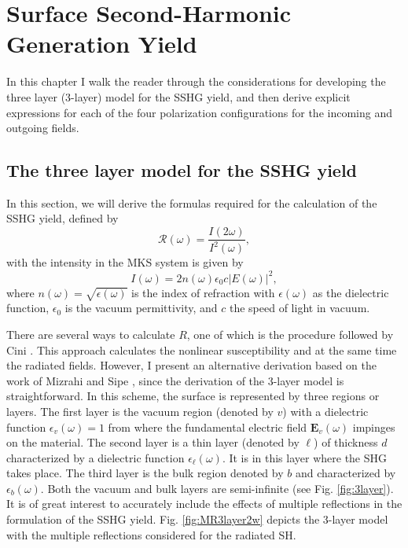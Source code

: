 \chapter{Surface Second-Harmonic Generation Yield}
\minitoc

In this chapter I walk the reader through the considerations for developing the
three layer (3-layer) model for the SSHG yield, and then derive explicit
expressions for each of the four polarization configurations for the incoming
and outgoing fields.



\section{The three layer model for the SSHG yield}

In this section, we will derive the formulas required for the calculation of the
SSHG yield, defined by
\begin{equation}\label{uno}
\mathcal{R}(\omega)=\frac{I(2\omega)}{I^2(\omega)},
\end{equation}
with the intensity in the MKS system is given by \cite{boyd, sutherland}
\begin{equation}\label{dos}
I(\omega)=2n(\omega)\epsilon_{0}c|E(\omega)|^2,
\end{equation}
where $n(\omega)=\sqrt{\epsilon(\omega)}$ is the index of refraction with
$\epsilon(\omega)$ as the dielectric function, $\epsilon_{0}$ is the vacuum
permittivity, and $c$ the speed of light in vacuum.

There are several ways to calculate $R$, one of which is the procedure followed
by Cini \cite{ciniPRB91}. This approach calculates the nonlinear susceptibility
and at the same time the radiated fields. However, I present an alternative
derivation based on the work of Mizrahi and Sipe \cite{mizrahiJOSA88}, since the
derivation of the 3-layer model is straightforward. In this scheme, the surface
is represented by three regions or layers. The first layer is the vacuum region
(denoted by $v$) with a dielectric function $\epsilon_{v}(\omega)=1$ from where
the fundamental electric field $\mathbf{E}_{v}(\omega)$ impinges on the
material. The second layer is a thin layer (denoted by $\ell$) of thickness $d$
characterized by a dielectric function $\epsilon_{\ell}(\omega)$. It is in this
layer where the SHG takes place. The third layer is the bulk region denoted by
$b$ and characterized by $\epsilon_{b}(\omega)$. Both the vacuum and bulk layers
are semi-infinite (see Fig. \ref{fig:3layer}). It is of great interest to
accurately include the effects of multiple reflections in the formulation of the
SSHG yield. Fig. \ref{fig:MR3layer2w} depicts the 3-layer model with the
multiple reflections considered for the radiated SH.

